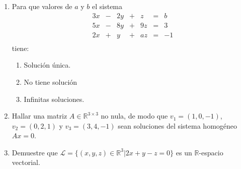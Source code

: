 \documentclass{article}
\begin{document}
\begin{enumerate}
\item Para que valores de $a$ y $b$ el sistema 
\[
\begin{array}{ccccccc}
 3x & - & 2y & + &  z & = &  b  \\
 5x & - & 8y & + & 9z & = &  3  \\
 2x & + &  y & + & az & = & -1  \\
\end{array}
\]
tiene:
\begin{enumerate}
    \item Solución única.
    \item  No tiene solución
    \item Infinitas soluciones.
\end{enumerate}
\item Hallar una matriz $A\in \mathbb{R}^{3\times 3}$ no nula, de modo que $v_1 = (1, 0, -1)$, $v_2 = (0, 2, 1)$ y $v_3 = (3, 4, -1)$ sean soluciones del sistema homogéneo $Ax = 0$.
\item Demuestre que $\mathcal{L} = \{(x, y, z) \in  \mathbb{R}^3 | 2x + y - z = 0\}$ es un $\mathbb{R}$-espacio vectorial.
\end{enumerate}
\end{document}
